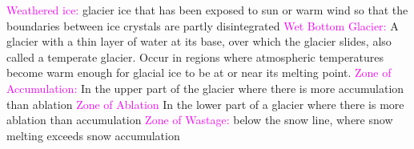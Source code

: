 \documentclass{article}
\newcommand{\pink}[1]{\textcolor{magenta}{#1}}
\newcommand{\vocab}[1]{{\pink{#1}}}
\begin{document}
\begin{multicols*}{4}
		\vocab{        Weathered ice: } glacier ice that has been exposed to sun or warm wind so that the boundaries between ice crystals are partly disintegrated
		\vocab{Wet Bottom Glacier: } A glacier with a thin layer of water at its base, over which the glacier slides, also called a temperate glacier. Occur in regions where atmospheric temperatures become warm enough for glacial ice to be at or near its melting point.  
		\vocab{Zone of Accumulation: } In the upper part of the glacier where there is more accumulation than ablation  
		\vocab{Zone of Ablation} In the lower part of a glacier where there is more ablation than accumulation  
		\vocab{Zone of Wastage: } below the snow line, where snow melting exceeds snow accumulation  

	   	
	\end{multicols*}
\end{document}
